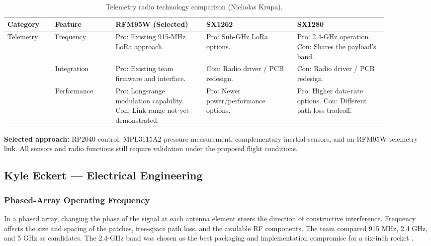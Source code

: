 \documentclass[11pt]{IEEEtran}
\begin{document}
\begin{table}[H]
\centering\small
\begin{tabular}{@{}p{0.115\linewidth}p{0.145\linewidth}p{0.21\linewidth}p{0.21\linewidth}p{0.21\linewidth}@{}}
\toprule
\textbf{Category} & \textbf{Feature} & \textbf{RFM95W (Selected)} & \textbf{SX1262} & \textbf{SX1280} \\
\midrule
\multirow{3}{*}{Telemetry}
 & Frequency & Pro: Existing 915-MHz LoRa approach. & Pro: Sub-GHz LoRa options. & Pro: 2.4-GHz operation. Con: Shares the payload's band. \\ \cmidrule{2-5}
 & Integration & Pro: Existing team firmware and interface. & Con: Radio driver / PCB redesign. & Con: Radio driver / PCB redesign. \\ \cmidrule{2-5}
 & Performance & Pro: Long-range modulation capability. Con: Link range not yet demonstrated. & Pro: Newer power/performance options. & Pro: Higher data-rate options. Con: Different path-loss tradeoff. \\
\bottomrule
\end{tabular}
\vspace{3mm}
\caption{Telemetry radio technology comparison (Nicholas Krupa).}
\label{tab:Radio_Comparison}
\end{table}

\noindent\textbf{Selected approach:} RP2040 control, MPL3115A2 pressure measurement, complementary inertial sensors, and an RFM95W telemetry link. All sensors and radio functions still require validation under the proposed flight conditions.

\subsection{Kyle Eckert --- Electrical Engineering}
\subsubsection{Phased-Array Operating Frequency}
In a phased array, changing the phase of the signal at each antenna element steers the direction of constructive interference. Frequency affects the size and spacing of the patches, free-space path loss, and the available RF components. The team compared 915 MHz, 2.4 GHz, and 5 GHz as candidates. The 2.4-GHz band was chosen as the best packaging and implementation compromise for a six-inch rocket \cite{phased,fcc15247}.
\end{document}
